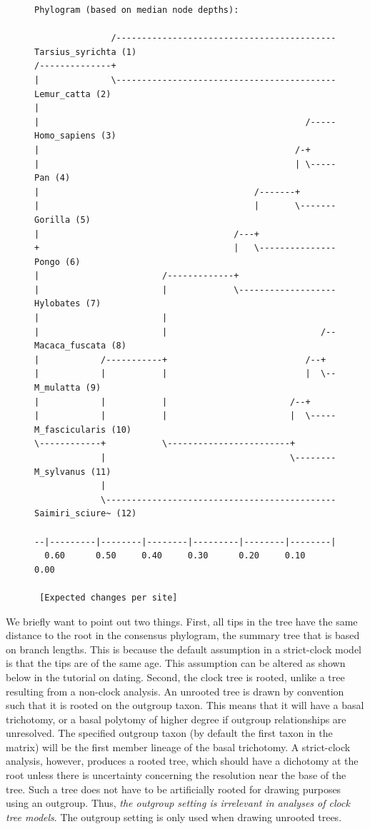 \documentclass[12pt]{book}
\begin{document}
\begin{figure}[H]
\centering
    \begin{BVerbatim}[fontsize=\scriptsize]
Phylogram (based on median node depths):

               /------------------------------------------- Tarsius_syrichta (1)
/--------------+
|              \------------------------------------------- Lemur_catta (2)
|
|                                                    /----- Homo_sapiens (3)
|                                                  /-+
|                                                  | \----- Pan (4)
|                                          /-------+
|                                          |       \------- Gorilla (5)
|                                      /---+
+                                      |   \--------------- Pongo (6)
|                        /-------------+
|                        |             \------------------- Hylobates (7)
|                        |
|                        |                              /-- Macaca_fuscata (8)
|            /-----------+                           /--+
|            |           |                           |  \-- M_mulatta (9)
|            |           |                        /--+
|            |           |                        |  \----- M_fascicularis (10)
\------------+           \------------------------+
             |                                    \-------- M_sylvanus (11)
             |
             \--------------------------------------------- Saimiri_sciure~ (12)

--|---------|--------|--------|---------|--------|--------|
  0.60      0.50     0.40     0.30      0.20     0.10     0.00                    

 [Expected changes per site]
\end{BVerbatim}
\end{figure}

We briefly want to point out two things. First, all tips in the tree have the same distance to the
root in the consensus phylogram, the summary tree that is based on branch lengths. This is because
the default assumption in a strict-clock model is that the tips are of the same age. This
assumption can be altered as shown below in the tutorial on dating. Second, the clock tree is
rooted, unlike a tree resulting from a non-clock analysis. An unrooted tree is drawn by convention
such that it is rooted on the outgroup taxon. This means that it will have a basal trichotomy, or a
basal polytomy of higher degree if outgroup relationships are unresolved. The specified outgroup
taxon (by default the first taxon in the matrix) will be the first member lineage of the basal
trichotomy. A strict-clock analysis, however, produces a rooted tree, which should have a dichotomy
at the root unless there is uncertainty concerning the resolution near the base of the tree. Such a
tree does not have to be artificially rooted for drawing purposes using an outgroup.  Thus,
\emph{the outgroup setting is irrelevant in analyses of clock tree models}. The outgroup setting is
only used when drawing unrooted trees.
\end{document}
